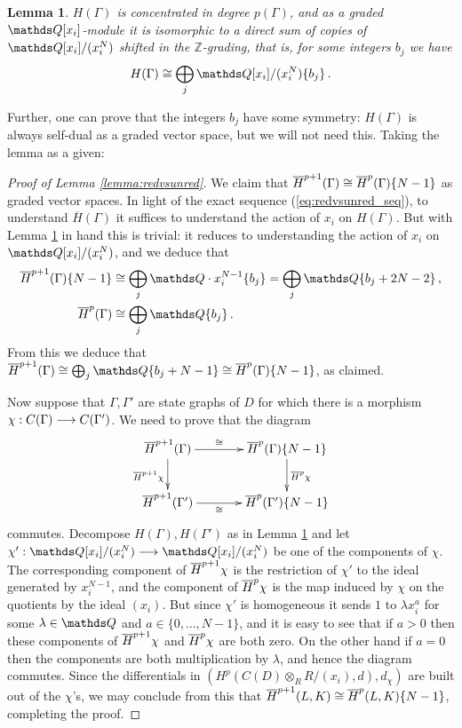 \documentclass{compositio}
\newtheorem{lemma}[theorem]{Lemma}
\theoremstyle{definition}
\numberwithin{equation}{section}
\begin{document}
\begin{lemma}\label{lemma:directsumalgebras} $H(\Gamma)$ is concentrated in degree $p(\Gamma)$, and as a graded $\QQ[x_i]$-module it is isomorphic to a direct sum of copies of $\QQ[x_i]/(x_i^N)$ shifted in the $\mathds{Z}$-grading, that is, for some integers $b_j$ we have
\[
H(\Gamma) \cong \bigoplus_{j} \QQ[x_i]/(x_i^N)\{b_j\} \, .
\]
\end{lemma}

Further, one can prove that the integers $b_j$ have some symmetry: $H(\Gamma)$ is always self-dual as a graded vector space, but we will not need this. Taking the lemma as a given:

\begin{proof}[Proof of Lemma \ref{lemma:redvsunred}] We claim that $\overline{H}^{p+1}(\Gamma) \cong \overline{H}^p(\Gamma)\{N-1\}$ as graded vector spaces. In light of the exact sequence (\ref{eq:redvsunred_seq}), to understand $\overline{H}(\Gamma)$ it suffices to understand the action of $x_i$ on $H(\Gamma)$. But with Lemma \ref{lemma:directsumalgebras} in hand this is trivial: it reduces to understanding the action of $x_i$ on $\QQ[x_i]/(x_i^N)$, and we deduce that
\begin{align*}
\redh^{p+1}(\Gamma)\{N-1\} &\cong \bigoplus_j \QQ \cdot x_i^{N-1} \{ b_j \} = \bigoplus_j \QQ\{b_j + 2N - 2 \} \, ,\\
\redh^p(\Gamma) &\cong \bigoplus_j \QQ \{ b_j \}\,.
\end{align*}
From this we deduce that $\redh^{p+1}(\Gamma) \cong \bigoplus_j \QQ\{b_j + N - 1 \} \cong \redh^p(\Gamma)\{N-1\}$, as claimed.

Now suppose that $\Gamma, \Gamma'$ are state graphs of $D$ for which there is a morphism $\chi: C(\Gamma) \longrightarrow C(\Gamma')$. We need to prove that the diagram
\[
\xymatrix@C+1pc{
\redh^{p+1}(\Gamma) \ar[d]_{\redh^{p+1}\chi}\ar[r]^-{\cong} & \redh^p(\Gamma)\{N-1\}\ar[d]^{\redh^p \chi}\\
\redh^{p+1}(\Gamma') \ar[r]_-{\cong} & \redh^p(\Gamma')\{N-1\}
}
\]
commutes. Decompose $H(\Gamma), H(\Gamma')$ as in Lemma \ref{lemma:directsumalgebras} and let $\chi': \QQ[x_i]/(x_i^N) \lto \QQ[x_i]/(x_i^N)$ be one of the components of $\chi$. The corresponding component of $\overline{H}^{p+1} \chi$ is the restriction of $\chi'$ to the ideal generated by $x_i^{N-1}$, and the component of $\overline{H}^p \chi$ is the map induced by $\chi$ on the quotients by the ideal $(x_i)$. But since $\chi'$ is homogeneous it sends $1$ to $\lambda x_i^a$ for some $\lambda \in \QQ$ and $a \in \{0,\ldots, N - 1\}$, and it is easy to see that if $a > 0$ then these components of $\overline{H}^{p+1} \chi$ and $\overline{H}^p \chi$ are both zero. On the other hand if $a = 0$ then the components are both multiplication by $\lambda$, and hence the diagram commutes. Since the differentials in $(H^p(C(D) \otimes_R R/(x_i),d), d_\chi)$ are built out of the $\chi$'s, we may conclude from this that $\overline{H}^{p+1}(L,K) \cong \overline{H}^{p}(L,K)\{N-1\}$, completing the proof.
\end{proof}
\end{document}
